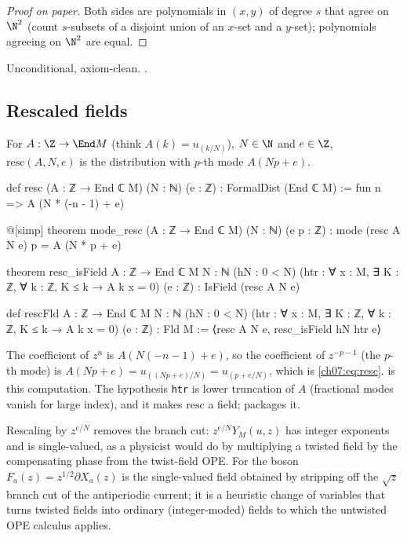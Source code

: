 \begin{proof}[Proof on paper]
Both sides are polynomials in $(x,y)$ of degree $s$ that agree on $\N^2$ (count $s$-subsets of a
disjoint union of an $x$-set and a $y$-set); polynomials agreeing on $\N^2$ are equal.
\end{proof}

\begin{status}
Unconditional, axiom-clean. .
\end{status}

\subsection{Rescaled fields}

\begin{definition}\label{ch07:def:resc}
For $A:\Z\to\End M$ (think $A(k) = u_{(k/N)}$), $N\in\N$ and $e\in\Z$, $\mathrm{resc}(A,N,e)$
is the distribution with $p$-th mode $A(Np+e)$.
\end{definition}

\begin{leancode}
def resc (A : ℤ → End ℂ M) (N : ℕ) (e : ℤ) : FormalDist (End ℂ M) :=
  fun n => A (N * (-n - 1) + e)

@[simp] theorem mode_resc (A : ℤ → End ℂ M) (N : ℕ) (e p : ℤ) :
    mode (resc A N e) p = A (N * p + e)

theorem resc_isField {A : ℤ → End ℂ M} {N : ℕ} (hN : 0 < N)
    (htr : ∀ x : M, ∃ K : ℤ, ∀ k : ℤ, K ≤ k → A k x = 0) (e : ℤ) : IsField (resc A N e)

def rescFld {A : ℤ → End ℂ M} {N : ℕ} (hN : 0 < N)
    (htr : ∀ x : M, ∃ K : ℤ, ∀ k : ℤ, K ≤ k → A k x = 0) (e : ℤ) : Fld M :=
  ⟨resc A N e, resc_isField hN htr e⟩
\end{leancode}

\begin{dictionary}
The coefficient of $z^n$ is $A(N(-n-1)+e)$, so the coefficient of $z^{-p-1}$ (the $p$-th mode) is
$A(Np+e) = u_{((Np+e)/N)} = u_{(p+e/N)}$, which is \eqref{ch07:eq:resc}.  is
this computation. The hypothesis \verb|htr| is lower truncation of $A$ (fractional modes vanish
for large index), and it makes $\mathrm{resc}$ a field;  packages it.
\end{dictionary}

\begin{physics}
Rescaling by $z^{e/N}$ removes the branch cut: $z^{e/N}Y_M(u,z)$ has integer exponents and is single-valued, as a physicist would do by multiplying a twisted field by the compensating phase from the twist-field OPE. For the boson $F_a(z)=z^{1/2}\partial X_a(z)$ is the single-valued field obtained by stripping off the $\sqrt z$ branch cut of the antiperiodic current; it is a heuristic change of variables that turns twisted fields into ordinary (integer-moded) fields to which the untwisted OPE calculus applies.
\end{physics}

